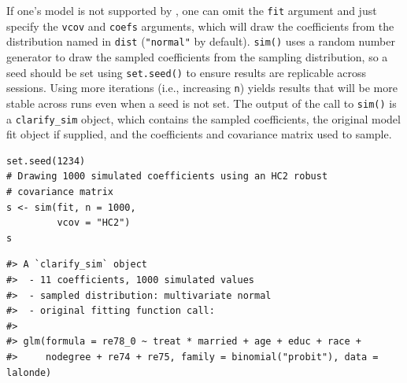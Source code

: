 If one's model is not supported by , one can omit the \texttt{fit} argument and just specify the \texttt{vcov} and \texttt{coefs} arguments, which will draw the coefficients from the distribution named in \texttt{dist} (\texttt{"normal"} by default).
\texttt{sim()} uses a random number generator to draw the sampled coefficients from the sampling distribution, so a seed should be set using \texttt{set.seed()} to ensure results are replicable across sessions. Using more iterations (i.e., increasing \texttt{n}) yields results that will be more stable across runs even when a seed is not set.
The output of the call to \texttt{sim()} is a \texttt{clarify\_sim} object, which contains the sampled coefficients, the original model fit object if supplied, and the coefficients and covariance matrix used to sample.
\begin{verbatim}
set.seed(1234)
# Drawing 1000 simulated coefficients using an HC2 robust
# covariance matrix
s <- sim(fit, n = 1000,
         vcov = "HC2")
s
\end{verbatim}
\begin{verbatim}
#> A `clarify_sim` object
#>  - 11 coefficients, 1000 simulated values
#>  - sampled distribution: multivariate normal
#>  - original fitting function call:
#> 
#> glm(formula = re78_0 ~ treat * married + age + educ + race + 
#>     nodegree + re74 + re75, family = binomial("probit"), data = lalonde)
\end{verbatim}
